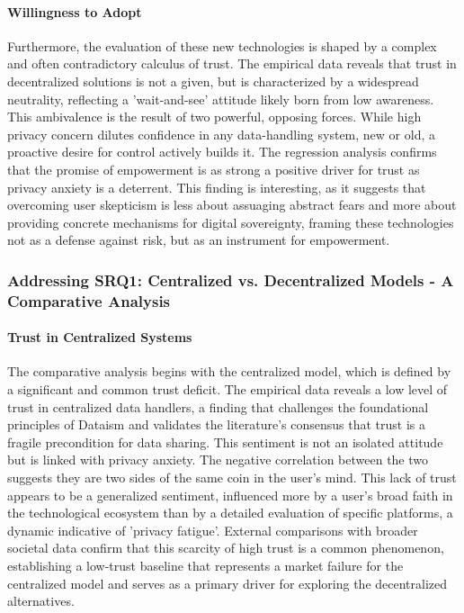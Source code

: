 	\paragraph{Willingness to Adopt}
	Furthermore, the evaluation of these new technologies is shaped by a complex and often contradictory calculus of trust. The empirical data reveals that trust in decentralized solutions is not a given, but is characterized by a widespread neutrality, reflecting a 'wait-and-see' attitude likely born from low awareness. This ambivalence is the result of two powerful, opposing forces. While high privacy concern dilutes confidence in any data-handling system, new or old, a proactive desire for control actively builds it. The regression analysis confirms that the promise of empowerment is as strong a positive driver for trust as privacy anxiety is a deterrent. This finding is interesting, as it suggests that overcoming user skepticism is less about assuaging abstract fears and more about providing concrete mechanisms for digital sovereignty, framing these technologies not as a defense against risk, but as an instrument for empowerment.
	\subsubsection{Addressing SRQ1: Centralized vs. Decentralized Models - A Comparative Analysis}

	\paragraph{Trust in Centralized Systems}
	The comparative analysis begins with the centralized model, which is defined by a significant and common trust deficit. The empirical data reveals a low level of trust in centralized data handlers, a finding that challenges the foundational principles of Dataism and validates the literature's consensus that trust is a fragile precondition for data sharing. This sentiment is not an isolated attitude but is linked with privacy anxiety. The negative correlation between the two suggests they are two sides of the same coin in the user's mind. This lack of trust appears to be a generalized sentiment, influenced more by a user's broad faith in the technological ecosystem than by a detailed evaluation of specific platforms, a dynamic indicative of 'privacy fatigue'. External comparisons with broader societal data confirm that this scarcity of high trust is a common phenomenon, establishing a low-trust baseline that represents a market failure for the centralized model and serves as a primary driver for exploring the decentralized alternatives.

